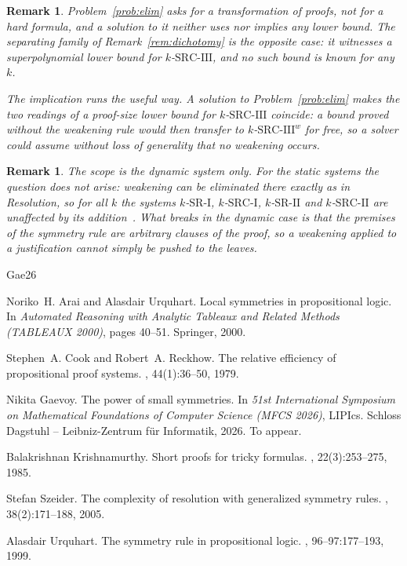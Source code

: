 \documentclass[10pt]{article}
\newtheorem{remark}[theorem]{Remark}
\newcommand{\SRI}{\text{SR-I}}
\newcommand{\SRII}{\text{SR-II}}
\newcommand{\SRCI}{\text{SRC-I}}
\newcommand{\SRCII}{\text{SRC-II}}
\newcommand{\SRCIII}{\text{SRC-III}}
\begin{document}
\begin{remark}\label{rem:independent}
Problem~\ref{prob:elim} asks for a transformation of proofs, not for a hard
formula, and a solution to it neither uses nor implies any lower bound. The
separating family of Remark~\ref{rem:dichotomy} is the opposite case: it
witnesses a superpolynomial lower bound for $k$-$\SRCIII$, and no such bound is
known for any $k$.

The implication runs the useful way. A solution to Problem~\ref{prob:elim}
makes the two readings of a proof-size lower bound for $k$-$\SRCIII$ coincide:
a bound proved without the weakening rule would then transfer to
$k$-$\SRCIII^{w}$ for free, so a solver could assume without loss of
generality that no weakening occurs.
\end{remark}

\begin{remark}\label{rem:scope}
The scope is the dynamic system only. For the static systems the question does
not arise: weakening can be eliminated there exactly as in Resolution, so for
all $k$ the systems $k$-$\SRI$, $k$-$\SRCI$, $k$-$\SRII$ and $k$-$\SRCII$ are
unaffected by its addition~\cite{Szeider05}. What breaks in the dynamic case is
that the premises of the symmetry rule are arbitrary clauses of the proof, so
a weakening applied to a justification cannot simply be pushed to the leaves.
\end{remark}

\begin{thebibliography}{Gae26}

Noriko~H. Arai and Alasdair Urquhart.
\newblock Local symmetries in propositional logic.
\newblock In {\em Automated Reasoning with Analytic Tableaux and Related
  Methods (TABLEAUX 2000)}, pages 40--51. Springer, 2000.

Stephen~A. Cook and Robert~A. Reckhow.
\newblock The relative efficiency of propositional proof systems.
, 44(1):36--50, 1979.

Nikita Gaevoy.
\newblock The power of small symmetries.
\newblock In {\em 51st International Symposium on Mathematical Foundations of
  Computer Science (MFCS 2026)}, LIPIcs. Schloss Dagstuhl -- Leibniz-Zentrum
  f\"{u}r Informatik, 2026.
\newblock To appear.

Balakrishnan Krishnamurthy.
\newblock Short proofs for tricky formulas.
, 22(3):253--275, 1985.

Stefan Szeider.
\newblock The complexity of resolution with generalized symmetry rules.
, 38(2):171--188, 2005.

Alasdair Urquhart.
\newblock The symmetry rule in propositional logic.
, 96--97:177--193, 1999.

\end{thebibliography}
\end{document}

